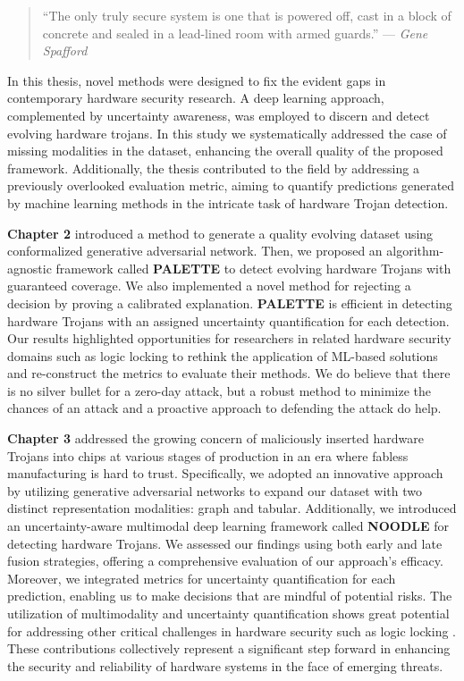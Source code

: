 \begingroup
\RaggedRight

\begin{quote}``The only truly secure system is one that is powered off, cast in a block of concrete and sealed in a lead-lined room with armed guards.''
\newline
\hfill  — \textit{Gene Spafford}
\end{quote}

In this thesis, novel methods were designed to fix the evident gaps in contemporary hardware security research. A deep learning approach, complemented by uncertainty awareness, was employed to discern and detect evolving hardware trojans. In this study we systematically addressed the case of missing modalities in the dataset, enhancing the overall quality of the proposed framework. Additionally, the thesis contributed to the field by addressing a previously overlooked evaluation metric, aiming to quantify predictions generated by machine learning methods in the intricate task of hardware Trojan detection.

\textbf{Chapter 2} introduced a method to generate a quality evolving dataset using conformalized generative adversarial network. Then, we proposed an algorithm-agnostic framework called \textbf{PALETTE} to detect evolving hardware Trojans with guaranteed coverage. We also implemented a novel method for rejecting a decision by proving a calibrated explanation. \textbf{PALETTE} is efficient in detecting hardware Trojans with an assigned uncertainty quantification for each detection. Our results highlighted opportunities for researchers in related hardware security domains such as logic locking \cite{Rezaei:BreakUnroll, Rezaei:PUF, Maynard:DK-Lock, Aghamohammadi:CoLA} to rethink the application of ML-based solutions and re-construct the metrics to evaluate their methods. We do believe that there is no silver bullet for a zero-day attack, but a robust method to minimize the chances of an attack and a proactive approach to defending the attack do help.

\textbf{Chapter 3} addressed the growing concern of maliciously inserted hardware Trojans into chips at various stages of production in an era where fabless manufacturing is hard to trust. Specifically, we adopted an innovative approach by utilizing generative adversarial networks to expand our dataset with two distinct representation modalities: graph and tabular. Additionally, we introduced an uncertainty-aware multimodal deep learning framework called \textbf{NOODLE} for detecting hardware Trojans. We assessed our findings using both early and late fusion strategies, offering a comprehensive evaluation of our approach's efficacy. Moreover, we integrated metrics for uncertainty quantification for each prediction, enabling us to make decisions that are mindful of potential risks. The utilization of multimodality and uncertainty quantification shows great potential for addressing other critical challenges in hardware security such as logic locking \cite{Rezaei:BreakUnroll, Rezaei:PUF, Maynard:DK-Lock, Aghamohammadi:CoLA}. These contributions collectively represent a significant step forward in enhancing the security and reliability of hardware systems in the face of emerging threats.

